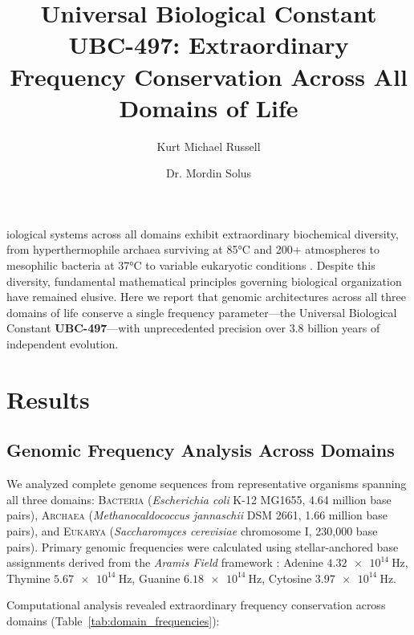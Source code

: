 \documentclass[9pt,twocolumn,twoside,lineno]{pnas-new}
\title{Universal Biological Constant UBC-497: Extraordinary Frequency Conservation Across All Domains of Life}
\author[a,1]{Kurt Michael Russell}
\author[a,1]{Dr. Mordin Solus}
\affil[a]{Independent Research Collaboration, GnosisLoom Project}
\newcommand{\UBC}[1]{\textbf{UBC-#1}}
\newcommand{\freq}[1]{\SI{#1}{\hertz}}
\newcommand{\domain}[1]{\textsc{#1}}
\newcommand{\aramis}{\textit{Aramis Field}}
\begin{document}
\maketitle
\thispagestyle{firststyle}

iological systems across all domains exhibit extraordinary biochemical diversity, from hyperthermophile archaea surviving at 85°C and 200+ atmospheres to mesophilic bacteria at 37°C to variable eukaryotic conditions \cite{woese_archaeal_1990, pace_universal_1997}. Despite this diversity, fundamental mathematical principles governing biological organization have remained elusive. Here we report that genomic architectures across all three domains of life conserve a single frequency parameter—the Universal Biological Constant \UBC{497}—with unprecedented precision over 3.8 billion years of independent evolution.

\section*{Results}

\subsection*{Genomic Frequency Analysis Across Domains}

We analyzed complete genome sequences from representative organisms spanning all three domains: \domain{Bacteria} (\textit{Escherichia coli} K-12 MG1655, 4.64 million base pairs), \domain{Archaea} (\textit{Methanocaldococcus jannaschii} DSM 2661, 1.66 million base pairs), and \domain{Eukarya} (\textit{Saccharomyces cerevisiae} chromosome I, 230,000 base pairs). Primary genomic frequencies were calculated using stellar-anchored base assignments derived from the \aramis{} framework \cite{russell_aramis_2025}: Adenine $\freq{4.32e14}$, Thymine $\freq{5.67e14}$, Guanine $\freq{6.18e14}$, Cytosine $\freq{3.97e14}$.

Computational analysis revealed extraordinary frequency conservation across domains (Table~\ref{tab:domain_frequencies}):
\end{document}
